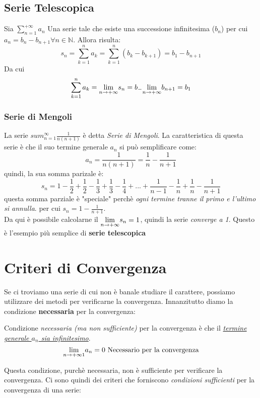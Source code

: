 \documentclass[12pt, a4paper, openany]{book}
\newcommand{\definizione}[1]{\begin{box_definizione} #1 \end{box_definizione}}
\begin{document}
\subsection{Serie Telescopica}
Sia $\sum_{n=1}^{+\infty} a_n$ Una serie tale che esiste una successione infinitesima ($b_n$) per cui $a_n = b_n - b_{n+1} \forall n\in \mathbb{N}$.
Allora risulta:
\begin{equation*}
    s_n = \sum_{k=1}^{n}a_k = \sum_{k=1}^n (b_k - b_{k+1}) = b_1 - b_{n+1}
\end{equation*}
Da cui
\begin{equation*}
    \sum_{k=1}^{n}a_k = \underset{n \to +\infty}{\lim} s_n = b_ - \underset{n \to +\infty}{\lim} b_{n+1} = b_1
\end{equation*}

\subsubsection*{Serie di Mengoli}
La serie $sum_{n=1}^\infty \frac{1}{n(n+1)}$ è detta \emph{Serie di Mengoli}.
La caratteristica di questa serie è che il suo termine generale $a_n$ si può semplificare come:
\begin{equation*}
    a_n = \frac{1}{n(n+1)} = \frac{1}{n} - \frac{1}{n+1}
\end{equation*}
quindi, la sua somma parizale è:
\begin{equation*}
    s_n = 1 - \frac{1}{2} + \frac{1}{2} - \frac{1}{3} +  \frac{1}{3} - \frac{1}{4} + ... +  \frac{1}{n-1} - \frac{1}{n} +  \frac{1}{n} - \frac{1}{n+1}
\end{equation*}
questa somma parziale è "speciale" perchè \emph{ogni termine tranne il primo e l'ultimo si annulla}. per cui $s_n = 1 - \frac{1}{n+1}$.
\\Da qui è possibile calcolarne il $\underset{n \to +\infty}{\lim} s_n = 1$, quindi la serie \emph{converge a 1}.
Questo è l'esempio più semplice di \textbf{serie telescopica}  

\section{Criteri di Convergenza}
Se ci troviamo una serie di cui non è banale studiare il carattere, possiamo utilizzare dei metodi per verificarne la convergenza.
Innanzitutto diamo la condizione \textbf{necessaria} per la convergenza:
\definizione{
    Condizione \emph{necessaria (ma non sufficiente)} per la convergenza è che il \underline{\emph{termine generale $a_n$ sia infinitesimo}}.
    \begin{equation*}
        \underset{n \to +\infty1}{\lim} a_n = 0 \text{ Necessario per la convergenza}
    \end{equation*}
    }
Questa condizione, purchè necessaria, non è sufficiente per verificare la convergenza.
Ci sono quindi dei criteri che forniscono \emph{condizioni sufficienti} per la convergenza di una serie:
\end{document}
